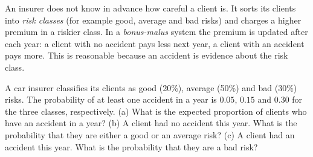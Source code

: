 
\begin{problem}
	\begin{context}
		An insurer does not know in advance how careful a client is. It sorts its
		clients into \emph{risk classes} (for example good, average and bad risks)
		and charges a higher premium in a riskier class. In a
		\emph{bonus-malus} system the premium is updated after each year: a client
		with no accident pays less next year, a client with an accident pays more.
		This is reasonable because an accident is evidence about the risk class.
	\end{context}
	A car insurer classifies its clients as good (20\%), average (50\%) and bad
	(30\%) risks. The probability of at least one accident in a year is $0.05$,
	$0.15$ and $0.30$ for the three classes, respectively.
	(a) What is the expected proportion of clients who have an accident in a
	year?
	(b) A client had no accident this year. What is the probability that they
	are either a good or an average risk?
	(c) A client had an accident this year. What is the probability that they
	are a bad risk?
\end{problem}

